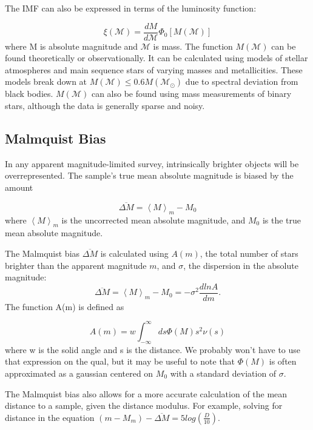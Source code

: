 The IMF can also be expressed in terms of the luminosity function:

\begin{equation}
\xi(\mathcal{M}) = \frac{dM}{d\mathcal{M}} \Phi_0 [M(\mathcal{M})]
\end{equation}
where M is absolute magnitude and $\mathcal{M}$ is mass. The function $M(\mathcal{M})$ can be found theoretically or observationally. It can be calculated using models of stellar atmospheres and main sequence stars of varying masses and metallicities. These models break down at $M(\mathcal{M}) \leq 0.6 M(\mathcal{M}_\odot)$ due to spectral deviation from black bodies. $M(\mathcal{M})$ can also be found using mass measurements of binary stars, although the data is generally sparse and noisy. 

\subsection{Malmquist Bias}

In any apparent magnitude-limited survey, intrinsically brighter objects will be overrepresented. The sample's true mean absolute magnitude is biased by the amount

\begin{equation}
\overline{\Delta M} = \left<M\right>_m - M_0
\end{equation}
where $\left<M\right>_m $ is the uncorrected mean absolute magnitude, and $M_0$ is the true mean absolute magnitude. 

The Malmquist bias $\overline{\Delta M}$ is calculated using $A(m)$, the total number of stars brighter than the apparent magnitude $m$, and $\sigma$, the dispersion in the absolute magnitude:
\begin{equation}
\overline{\Delta M} = \left<M\right>_m - M_0 = -\sigma^2 \frac{d ln A}{dm}.
\end{equation}
The function A(m) is defined as

\begin{equation}
A(m) = w\int^\infty_{-\infty} ds \Phi(M) s^2 \nu(s)
\end{equation}
where w is the solid angle and s is the distance. We probably won't have to use that expression on the qual, but it may be useful to note that $\Phi(M)$ is often approximated as a gaussian centered on $M_0$ with a standard deviation of $\sigma$. 

The Malmquist bias also allows for a more accurate calculation of the mean distance to a sample, given the distance modulus. For example, solving for distance in the equation $(m-M_m)-\overline{\Delta M} = 5log\left(\frac{D}{10} \right)$.


